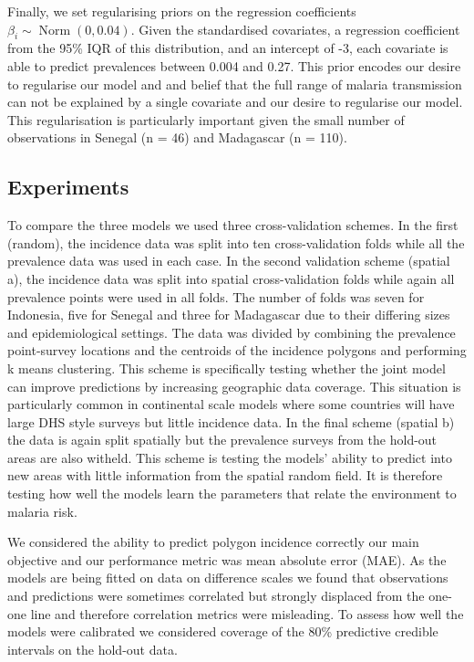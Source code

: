 \documentclass[10pt,letterpaper]{article}
\begin{document}
Finally, we set regularising priors on the regression coefficients $\beta_i \sim \operatorname{Norm}(0, 0.04)$. 
Given the standardised covariates, a regression coefficient from the 95\% IQR of this distribution, and an intercept of -3, each covariate is able to predict prevalences between 0.004 and 0.27. 
This prior encodes our desire to regularise our model and and belief that the full range of malaria transmission can not be explained by a single covariate and our desire to regularise our model.
This regularisation is particularly important given the small number of observations in Senegal (n = 46) and Madagascar (n = 110).



\subsection*{Experiments}

To compare the three models we used three cross-validation schemes. 
In the first (random), the incidence data was split into ten cross-validation folds while all the prevalence data was used in each case.
In the second validation scheme (spatial a), the incidence data was split into spatial cross-validation folds while again all prevalence points were used in all folds.
The number of folds was seven for Indonesia, five for Senegal and three for Madagascar due to their differing sizes and epidemiological settings.
The data was divided by combining the prevalence point-survey locations and the centroids of the incidence polygons and performing k means clustering.
This scheme is specifically testing whether the joint model can improve predictions by increasing geographic data coverage.
This situation is particularly common in continental scale models where some countries will have large DHS style surveys but little incidence data.
In the final scheme (spatial b) the data is again split  spatially but the prevalence surveys from the hold-out areas are also witheld.
This scheme is testing the models' ability to predict into new areas with little information from the spatial random field.
It is therefore testing how well the models learn the parameters that relate the environment to malaria risk.

We considered the ability to predict polygon incidence correctly our main objective and our performance metric was mean absolute error (MAE).
As the models are being fitted on data on difference scales we found that observations and predictions were sometimes correlated but strongly displaced from the one-one line and therefore correlation metrics were misleading.
To assess how well the models were calibrated we considered coverage of the 80\% predictive credible intervals on the hold-out data.
\end{document}
